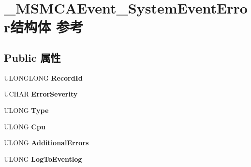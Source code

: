 \hypertarget{struct___m_s_m_c_a_event___system_event_error}{}\section{\+\_\+\+M\+S\+M\+C\+A\+Event\+\_\+\+System\+Event\+Error结构体 参考}
\label{struct___m_s_m_c_a_event___system_event_error}
\subsection*{Public 属性}
\begin{DoxyCompactItemize}
\item 
\mbox{\label{struct___m_s_m_c_a_event___system_event_error_a75e9588a7cdf50c60a82de461772548c}} 
U\+L\+O\+N\+G\+L\+O\+NG {\bfseries Record\+Id}
\item 
\mbox{\label{struct___m_s_m_c_a_event___system_event_error_a627b337ab6882368da3de283a74bc1d2}} 
U\+C\+H\+AR {\bfseries Error\+Severity}
\item 
\mbox{\label{struct___m_s_m_c_a_event___system_event_error_a7d5820510e2f39c8dc39b784eda7555c}} 
U\+L\+O\+NG {\bfseries Type}
\item 
\mbox{\label{struct___m_s_m_c_a_event___system_event_error_a2c7ba1d4a10ee937766bf79c5aeadeac}} 
U\+L\+O\+NG {\bfseries Cpu}
\item 
\mbox{\label{struct___m_s_m_c_a_event___system_event_error_a6b9753a25fd053dd8871746ff14ca57e}} 
U\+L\+O\+NG {\bfseries Additional\+Errors}
\item 
\mbox{\label{struct___m_s_m_c_a_event___system_event_error_a828987888c7968face45503a6d27452c}} 
U\+L\+O\+NG {\bfseries Log\+To\+Eventlog}
\item 
\mbox{\label{struct___m_s_m_c_a_event___system_event_error_abfc98df37308a137be5c9db5db8f5d9f}} 

\end{DoxyCompactItemize}
